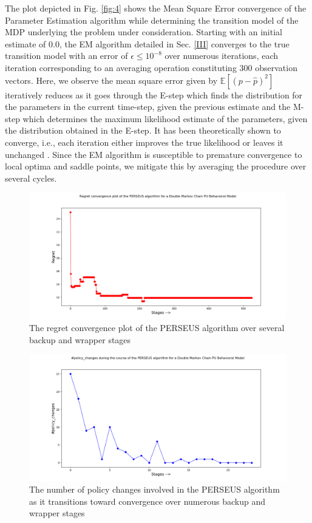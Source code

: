 \documentclass[10pt,twocolumn]{IEEEtran}
\begin{document}
The plot depicted in Fig. \ref{fig:4} shows the Mean Square Error convergence of the Parameter Estimation algorithm while determining the transition model of the MDP underlying the problem under consideration. Starting with an initial estimate of 0.0, the EM algorithm detailed in Sec. \ref{III} converges to the true transition model  with an error of $\epsilon \leq 10^{-8}$ over numerous iterations, each iteration corresponding to an averaging operation constituting 300 observation vectors. Here, we observe the mean square error given by $\mathbb{E}[(p - \hat{p})^{2}]$ iteratively reduces as it goes through the E-step which finds the distribution for the parameters in the current time-step, given the previous estimate and the M-step which determines the maximum likelihood estimate of the parameters, given the distribution obtained in the E-step. It has been theoretically shown to converge, i.e., each iteration either improves the true likelihood or leaves it unchanged \cite{Neal1998}. Since the EM algorithm is susceptible to premature convergence to local optima and saddle points, we mitigate this by averaging the procedure over several cycles.
\begin{figure}
    \centering
    \includegraphics[scale=0.25]{Regret_Convergence_Plot_04112019.png}
    \caption{The regret convergence plot of the PERSEUS algorithm over several backup and wrapper stages}
    \label{fig:5}
\end{figure}
\begin{figure}
    \centering
    \includegraphics[scale=0.25]{Policy_Changes_Plot_04112019.png}
    \caption{The number of policy changes involved in the PERSEUS algorithm as it transitions toward convergence over numerous backup and wrapper stages}
    \label{fig:6}
\end{figure}
\end{document}
